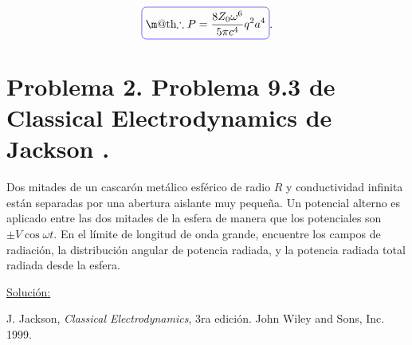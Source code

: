 \documentclass[a4paper,11pt]{article}
\makeatletter
\numberwithin{equation}{section}
\newcommand*{\boxcolor}{blue}
\renewcommand{\boxed}[1]{\textcolor{\boxcolor}{%
\tikz[baseline={([yshift=-1ex]current bounding box.center)}] \node [rectangle, minimum width=1ex,rounded corners,draw] {\normalcolor\m@th$\displaystyle#1$};}}
\makeatother
\begin{document}
\begin{equation}
 \boxed{\therefore P = \frac{8Z_0\omega^6}{5\pi c^4}q^2a^4}.
\end{equation}

\newpage

\section{Problema 2. Problema 9.3 de Classical Electrodynamics de 
Jackson \cite{jackson}.}

Dos mitades de un cascarón metálico esférico de radio $R$ y conductividad infinita 
están separadas por una abertura aislante muy pequeña. Un potencial alterno es 
aplicado entre las dos mitades de la esfera de manera que los potenciales son 
$\pm V \cos{\omega t}$. En el límite de longitud de onda grande, encuentre los campos 
de radiación, la distribución angular de potencia radiada, y la potencia radiada 
total radiada desde la esfera. 

\vspace{.3cm}

\underline{Solución:} \vspace{.3cm}

\begin{thebibliography}{10}
J. Jackson, \emph{Classical Electrodynamics}, 3ra edición. John Wiley and Sons, Inc. 
1999.
\end{thebibliography}
\end{document}
